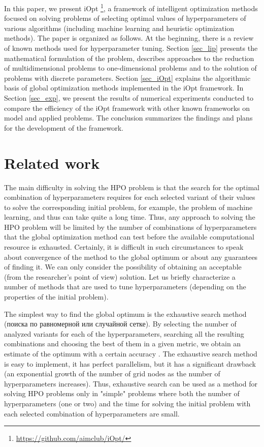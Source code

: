 \documentclass[preprint,12pt]{elsarticle}
\begin{document}
In this paper, we present iOpt \footnote{\url{https://github.com/aimclub/iOpt/}}, a framework of intelligent optimization methods focused on solving problems of selecting optimal values of hyperparameters of various algorithms (including machine learning and heuristic optimization methods). The paper is organized as follows. At the beginning, there is a review of known methods used for hyperparameter tuning. Section \ref{sec_lip} presents the mathematical formulation of the problem, describes approaches to the reduction of multidimensional problems to one-dimensional problems and to the solution of problems with discrete parameters. Section \ref{sec_iOpt} explains the algorithmic basis of global optimization methods implemented in the iOpt framework. In Section \ref{sec_exp}, we present the results of numerical experiments conducted to compare the efficiency of the iOpt framework with other known frameworks on model and applied problems. The conclusion summarizes the findings and plans   for the development of the framework.


\section{Related work}
\label{sec_rel}

The main difficulty in solving the HPO problem is that the search for the optimal combination of hyperparameters requires for each selected variant of their values to solve the corresponding initial problem, for example, the problem of machine learning, and thus can take quite a long time. Thus, any approach to solving the HPO problem will be limited by the number of combinations of hyperparameters that the global optimization method can test before the available computational resource is exhausted.  Certainly, it is difficult in such circumstances to speak about convergence of the method to the global optimum or about any guarantees of finding it. We can only consider the possibility of obtaining an acceptable (from the researcher's point of view) solution. Let us briefly characterize a number of methods that are used to tune hyperparameters (depending on the properties of the initial problem). 

The simplest way to find the global optimum is the exhaustive search method (поиска по равномерной \cite{Bao2006} или случайной \cite{Bergstra2012} сетке). By selecting the number of analyzed variants for each of the hyperparameters, searching all the resulting combinations and choosing the best of them in a given metric, we obtain an estimate of the optimum with a certain accuracy \cite{Nevendra2022}. The exhaustive search method is easy to implement, it has perfect parallelism, but it has a significant drawback (an exponential growth of the number of grid nodes as the number of hyperparameters increases). Thus, exhaustive search can be used as a method for solving HPO problems only in "simple" problems where both the number of hyperparameters (one or two) and the time for solving the initial problem with each selected combination of hyperparameters are small. 
\end{document}
